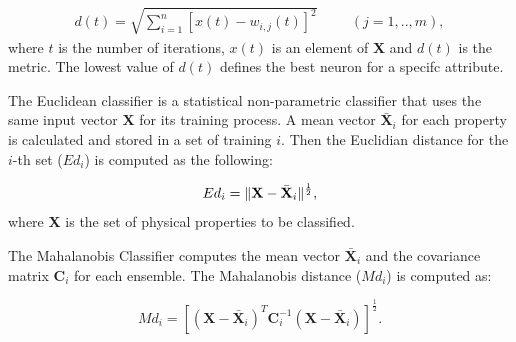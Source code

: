 \documentclass{cph18}
\begin{document}
\begin{eqnarray}
d(t)= \sqrt{\sum^{n}_{i=1}[x(t)-w_{i,j}(t)]^{2}} \hspace{1cm}  (j = {1,..,m}), %
\label{eq1}
\end{eqnarray}
 where $t$ is the number of iterations, $x(t)$ is an element of \textbf{X} and $d(t)$ is the metric. The lowest value of $d(t)$ defines the best neuron for a specifc attribute.
 
 

%

%

The Euclidean classifier is a statistical non-parametric classifier that uses the same input vector  $\textbf{X}$ for its training process. A mean vector $\bar{\textbf{X}}_{i}$ for each property is calculated and stored in a set of training $i$. Then the Euclidian distance for the $i$-th set ($Ed_{i} $) is computed as the following:

\begin{equation}
Ed_{i} =  \Arrowvert \textbf{X}-\bar{\textbf{X}}_{i}  \Arrowvert^{\frac{1}{2}}, 
\label{eq4}
\end{equation}  
where \textbf{X} is the set of physical properties to be classified. 

The Mahalanobis Classifier computes the mean vector $\bar{\textbf{X}}_{i}$ and the covariance matrix $\textbf{C}_{i}$ for each ensemble. The Mahalanobis distance ($Md_{i}$) is computed as:


\begin{equation}
Md_{i}=[(\textbf{X}-\bar{\textbf{X}}_{i})^{T}\textbf{C}_{i}^{-1}(\textbf{X}-\bar{\textbf{X}}_{i})]^{\frac{1}{2}}.
\label{eq5}
\end{equation}
\end{document}
